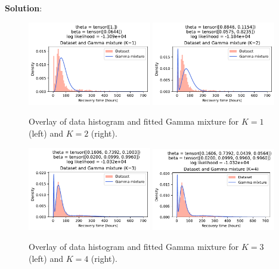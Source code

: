 \documentclass[submit]{../harvardml}
\newenvironment{solution}{
    \vspace{2mm}
    \color{blue}\noindent\textbf{Solution}:
}{}
\begin{document}
\begin{solution}
  \begin{figure}[ht]
    \centering
    \includegraphics[width=0.48\textwidth]{img_output/p2_3_1mixtures.pdf}
    \hfill
    \includegraphics[width=0.48\textwidth]{img_output/p2_3_2mixtures.pdf}
    \caption{Overlay of data histogram and fitted Gamma mixture for $K=1$ (left) and $K=2$ (right).}
    \label{fig:gamma-mixtures-12}
  \end{figure}
  
  \begin{figure}[ht]
    \centering
    \includegraphics[width=0.48\textwidth]{img_output/p2_3_3mixtures.pdf}
    \hfill
    \includegraphics[width=0.48\textwidth]{img_output/p2_3_4mixtures.pdf}
    \caption{Overlay of data histogram and fitted Gamma mixture for $K=3$ (left) and $K=4$ (right).}
    \label{fig:gamma-mixtures-34}
  \end{figure}


\end{solution}
\end{document}
